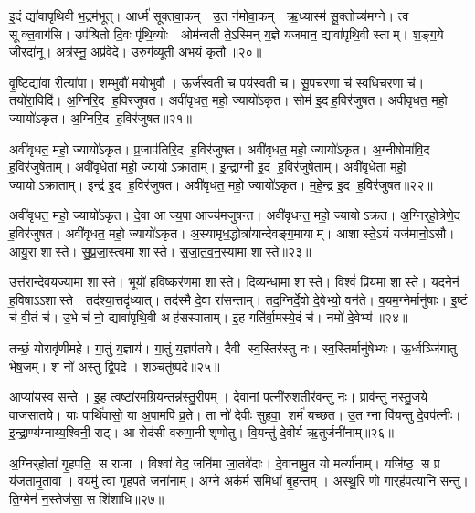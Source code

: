इ॒दं द्या॑वापृथिवी भ॒द्रम॑भूत्।
आर्ध्म॑ सूक्तवा॒कम्।
उ॒त न॑मोवा॒कम्।
ऋ॒ध्यास्म॑ सू॒क्तोच्य॑मग्ने।
त्व सूक्त॒वाग॑सि।
उप॑श्रितो दि॒वः पृ॑थि॒व्योः।
ओम॑न्वती ते॒ऽस्मिन् य॒ज्ञे य॑जमान॒ द्यावा॑पृथि॒वी स्ताम्।
श॒ङ्ग॒ये जी॒रदा॑नू।
अत्र॑स्नू॒ अप्र॑वेदे।
उ॒रुग॑व्यूती अभयं॒ कृतौ॥२०॥

वृ॒ष्टिद्या॑वा री॒त्या॑पा।
श॒म्भुवौ॑ मयो॒भुवौ।
ऊर्ज॑स्वती च॒ पय॑स्वती च।
सू॒प॒च॒र॒णा च॑ स्वधिचर॒णा च॑।
तयो॑रा॒विदि॑।
अ॒ग्निरि॒द ह॒विर॑जुषत।
अवी॑वृधत॒ महो॒ ज्यायो॑ऽकृत।
सोम॑ इ॒दह॒विर॑जुषत।
अवी॑वृधत॒ महो॒ ज्यायो॑ऽकृत।
अ॒ग्निरि॒द ह॒विर॑जुषत॥२१॥

अवी॑वृधत॒ महो॒ ज्यायो॑ऽकृत।
प्र॒जाप॑तिरि॒द ह॒विर॑जुषत।
अवी॑वृधत॒ महो॒ ज्यायो॑ऽकृत।
अ॒ग्नीषोमा॑वि॒द ह॒विर॑जुषेताम्।
अवी॑वृधेतां॒ महो॒ ज्यायोऽक्राताम्।
इ॒न्द्रा॒ग्नी इ॒द ह॒विर॑जुषेताम्।
अवी॑वृधेतां॒ महो॒ ज्यायोऽक्राताम्।
इन्द्र॑ इ॒द ह॒विर॑जुषत।
अवी॑वृधत॒ महो॒ ज्यायो॑ऽकृत।
म॒हे॒न्द्र इ॒द ह॒विर॑जुषत॥२२॥

अवी॑वृधत॒ महो॒ ज्यायो॑ऽकृत।
दे॒वा आज्य॒पा आज्य॑मजुषन्त।
अवी॑वृधन्त॒ महो॒ ज्यायोऽक्रत।
अ॒ग्निर्‌हो॒त्रेणे॒द ह॒विर॑जुषत।
अवी॑वृधत॒ महो॒ ज्यायो॑ऽकृत।
अ॒स्यामृध॒द्धोत्रा॑यान्देवङ्ग॒मायाम्।
आशास्ते॒ऽयं यज॑मानो॒ऽसौ।
आयु॒रा शास्ते।
सु॒प्र॒जा॒स्त्वमा शास्ते।
स॒जा॒त॒व॒न॒स्यामा शास्ते॥२३॥

उत्त॑रान्देवय॒ज्यामा शास्ते।
भूयो॑ हवि॒ष्कर॑ण॒मा शास्ते।
दि॒व्यन्धामा शास्ते।
विश्वं॑ प्रि॒यमा शास्ते।
यद॒नेन॑ ह॒विषाऽऽशास्ते।
तद॑श्या॒त्तदृ॑ध्यात्।
तद॑स्मै दे॒वा रा॑सन्ताम्।
तद॒ग्निर्दे॒वो दे॒वेभ्यो॒ वन॑ते।
व॒यम॒ग्नेर्मानु॑षाः।
इ॒ष्टं च॑ वी॒तं च॑।
उ॒भे च॑ नो॒ द्यावा॑पृथि॒वी अह॑सस्पाताम्।
इ॒ह गति॑र्वा॒मस्ये॒दं च॑।
नमो॑ दे॒वेभ्य॑॥२४॥\anuvakamend[अ॒भ॒यं॒ कृता॑वकृता॒ग्निरि॒द ह॒विर॑जुषत महे॒न्द्र इ॒द ह॒विर॑जुषत सजातवन॒स्यामा शास्ते वी॒तं च॒ त्रीणि॑ च]

तच्छं॒ योरावृ॑णीमहे।
गा॒तुं य॒ज्ञाय॑।
गा॒तुं य॒ज्ञप॑तये।
दैवी स्व॒स्तिर॑स्तु नः।
स्व॒स्तिर्मानु॑षेभ्यः।
ऊ॒र्ध्वञ्जि॑गातु भेष॒जम्।
शं नो॑ अस्तु द्वि॒पदे।
शञ्चतु॑ष्पदे॥२५॥\anuvakamend[तच्छं॒ योर॒ष्टौ]

आप्या॑यस्व॒ सन्ते।
इ॒ह त्वष्टा॑रमग्रि॒यन्तन्न॑स्तु॒रीपम्।
दे॒वानां॒ पत्नी॑रुश॒तीर॑वन्तु नः।
प्राव॑न्तु नस्तु॒जये॒ वाज॑सातये।
याः पार्थि॑वासो॒ या अ॒पामपि॑ व्र॒ते।
ता नो॑ देवीः सुहवा॒ शर्म॑ यच्छत।
उ॒त ग्ना वि॑यन्तु दे॒वप॑त्नीः।
इ॒न्द्रा॒ण्य॑ग्नाय्य॒श्विनी॒ राट्।
आ रोद॑सी वरुणा॒नी शृ॑णोतु।
वि॒यन्तु॑ दे॒वीर्य ऋ॒तुर्जनी॑नाम्॥२६॥

अ॒ग्निर्‌होता॑ गृ॒हप॑ति॒ स राजा।
विश्वा॑ वेद॒ जनि॑मा जा॒तवे॑दाः।
दे॒वाना॑मु॒त यो मर्त्या॑नाम्।
यजि॑ष्ठ॒ स प्र य॑जतामृ॒तावा।
व॒यमु॑ त्वा गृहपते॒ जना॑नाम्।
अग्ने॒ अक॑र्म स॒मिधा॑ बृ॒हन्तम्।
अ॒स्थू॒रि णो॒ गार्‌ह॑पत्यानि सन्तु।
ति॒ग्मेन॑ न॒स्तेज॑सा॒ सशि॑शाधि॥२७॥\anuvakamend[जनी॑नाम॒ष्टौ च॑]

